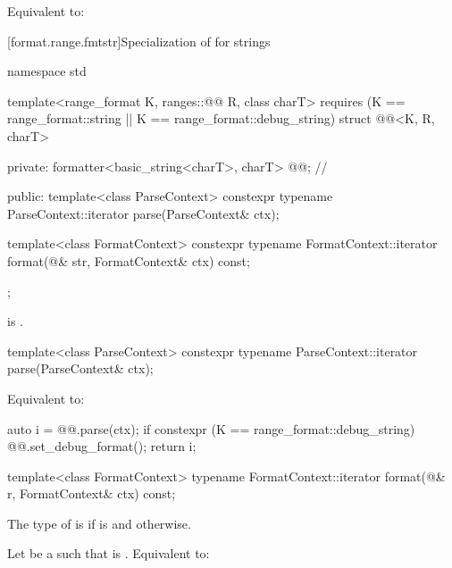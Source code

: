 \begin{itemdescr}
\pnum
\effects
Equivalent to: 
\end{itemdescr}

[format.range.fmtstr]{Specialization of  for strings}

%
\begin{codeblock}
namespace std {
  template<range_format K, ranges::@@ R, class charT>
    requires (K == range_format::string || K == range_format::debug_string)
  struct @@<K, R, charT> {
  private:
    formatter<basic_string<charT>, charT> @@;                  // \expos

  public:
    template<class ParseContext>
      constexpr typename ParseContext::iterator
        parse(ParseContext& ctx);

    template<class FormatContext>
      constexpr typename FormatContext::iterator
        format(@\seebelow@& str, FormatContext& ctx) const;
  };
}
\end{codeblock}

\pnum
\mandates
{}
is .

%
\begin{itemdecl}
template<class ParseContext>
  constexpr typename ParseContext::iterator
    parse(ParseContext& ctx);
\end{itemdecl}

\begin{itemdescr}
\pnum
\effects
Equivalent to:
\begin{codeblock}
auto i = @@.parse(ctx);
if constexpr (K == range_format::debug_string) {
  @@.set_debug_format();
}
return i;
\end{codeblock}
\end{itemdescr}

%
\begin{itemdecl}
template<class FormatContext>
  typename FormatContext::iterator
    format(@\seebelow@& r, FormatContext& ctx) const;
\end{itemdecl}

\begin{itemdescr}
\pnum
The type of  is 
if  is  and
 otherwise.

\pnum
\effects
Let  be a  such that
 is .
Equivalent to: 
\end{itemdescr}

